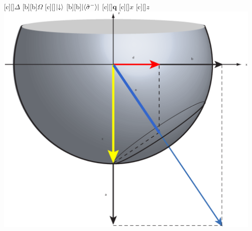 

 \figstyle
 [c][]{$\Delta$}
 [b][b]{$\Omega$}
 [c][]{$\lvert\downarrow\rangle$}
 [b][b]{$\lvert\langle\tilde{\sigma}^-\rangle\rvert$}
 [c][]{$\mathbf{q}$}%
 [c][]{$x$}
 [c][]{$z$}
 \includegraphics[height=\medheight]{blochspheretoymodel.eps}

